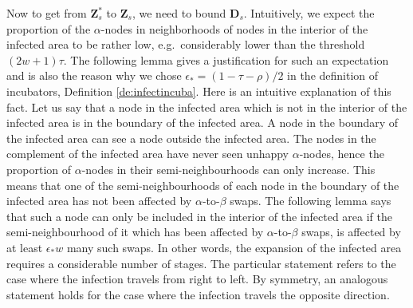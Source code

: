 \documentclass[11pt]{article}
\theoremstyle{plain}
\numberwithin{equation}{subsection}
\newcommand{\ZZ}{\mathbf{Z}}
\newcommand{\DD}{\mathbf{D}}
\begin{document}
Now to get from $\ZZ_s^{\ast}$ to $\ZZ_s$, we need to bound $\DD_s$. 
Intuitively, we expect the proportion of the $\alpha$-nodes in
neighborhoods of nodes in the interior of the 
infected area to be rather low, e.g.\ considerably lower than the threshold $(2w+1)\tau$.
The following lemma gives a justification for such an expectation 
and is also the reason why we chose  
$\epsilon_{\ast}=(1-\tau-\rho)/2$ in the definition of incubators, Definition \ref{de:infectincuba}.
Here is an intuitive explanation of this fact.
Let us say that a node in the infected area which is not in the interior of the infected
area is in the boundary of the infected area.
A node in the boundary of the infected area can
see a node outside the infected area. The nodes in the complement of
the infected area have never seen unhappy $\alpha$-nodes, hence the
proportion of $\alpha$-nodes in their
semi-neighbourhoods can only increase. This means that one of the
semi-neighbourhoods of each node in the boundary of the infected area has not
been affected by $\alpha$-to-$\beta$ swaps.
The following lemma says that such a node can only be included in the interior
of the infected area if the semi-neighbourhood of it which has been affected by
$\alpha$-to-$\beta$ swaps, is affected by at least $\epsilon_{\ast}w$ many such swaps.
In other words, the expansion of the infected area requires a considerable number of
stages.
The particular statement refers to the case where the infection travels from
right to left. 
By symmetry, an analogous statement 
holds for the case where the infection travels the opposite direction.
\end{document}
